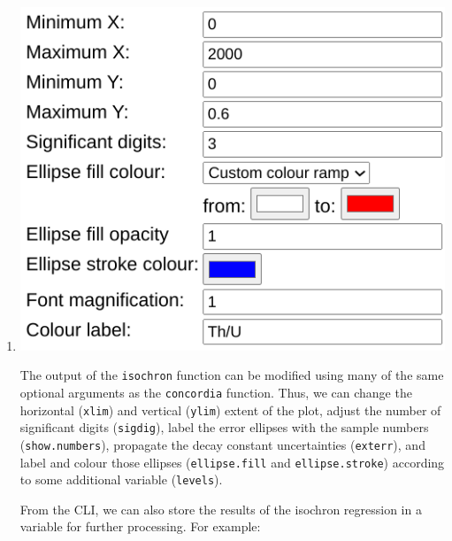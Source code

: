 \begin{refsection}
\begin{enumerate}
\item \noindent\begin{minipage}[t]{.4\linewidth}
  \strut\vspace*{-\baselineskip}\newline
  \includegraphics[width=\linewidth]{../figures/UPbIsochronExtraOptions.png}\\
\end{minipage}
  \begin{minipage}[t]{.6\linewidth}
    The output of the \texttt{isochron} function can be modified using
    many of the same optional arguments as the \texttt{concordia}
    function.  Thus, we can change the horizontal (\texttt{xlim}) and
    vertical (\texttt{ylim}) extent of the plot, adjust the number of
    significant digits (\texttt{sigdig}), label the error ellipses
    with the sample numbers (\texttt{show.numbers}), propagate the
    decay constant uncertainties (\texttt{exterr}), and label and
    colour those ellipses (\texttt{ellipse.fill} and
    \texttt{ellipse.stroke}) according to some additional variable
    (\texttt{levels}).
\end{minipage}
From the CLI, we can also store the results of the isochron regression
in a variable for further processing. For example:


\end{enumerate}
\end{refsection}
